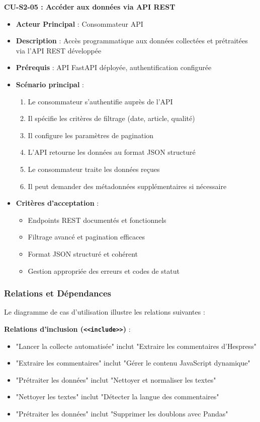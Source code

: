 \textbf{CU-S2-05 : Accéder aux données via API REST}
\begin{itemize}
    \item \textbf{Acteur Principal} : Consommateur API
    \item \textbf{Description} : Accès programmatique aux données collectées et prétraitées via l'API REST développée
    \item \textbf{Prérequis} : API FastAPI déployée, authentification configurée
    \item \textbf{Scénario principal} :
    \begin{enumerate}
        \item Le consommateur s'authentifie auprès de l'API
        \item Il spécifie les critères de filtrage (date, article, qualité)
        \item Il configure les paramètres de pagination
        \item L'API retourne les données au format JSON structuré
        \item Le consommateur traite les données reçues
        \item Il peut demander des métadonnées supplémentaires si nécessaire
    \end{enumerate}
    \item \textbf{Critères d'acceptation} :
    \begin{itemize}
        \item Endpoints REST documentés et fonctionnels
        \item Filtrage avancé et pagination efficaces
        \item Format JSON structuré et cohérent
        \item Gestion appropriée des erreurs et codes de statut
    \end{itemize}
\end{itemize}

\subsubsection{Relations et Dépendances}

Le diagramme de cas d'utilisation illustre les relations suivantes :

\textbf{Relations d'inclusion (\texttt{<<include>>})} :
\begin{itemize}
    \item "Lancer la collecte automatisée" inclut "Extraire les commentaires d'Hespress"
    \item "Extraire les commentaires" inclut "Gérer le contenu JavaScript dynamique"
    \item "Prétraiter les données" inclut "Nettoyer et normaliser les textes"
    \item "Nettoyer les textes" inclut "Détecter la langue des commentaires"
    \item "Prétraiter les données" inclut "Supprimer les doublons avec Pandas"
\end{itemize}

